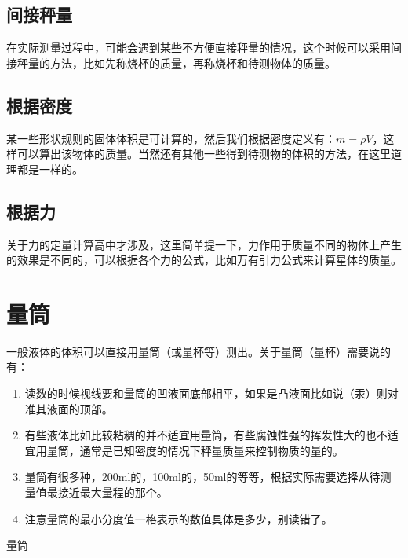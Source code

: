 \documentclass[12pt,twoside]{exam}
\begin{document}
\begin{knowledge}
\subsection{间接秤量}
在实际测量过程中，可能会遇到某些不方便直接秤量的情况，这个时候可以采用间接秤量的方法，比如先称烧杯的质量，再称烧杯和待测物体的质量。

\subsection{根据密度}
某一些形状规则的固体体积是可计算的，然后我们根据密度定义有：$m=\rho V$，这样可以算出该物体的质量。当然还有其他一些得到待测物的体积的方法，在这里道理都是一样的。

\subsection{根据力}
关于力的定量计算高中才涉及，这里简单提一下，力作用于质量不同的物体上产生的效果是不同的，可以根据各个力的公式，比如万有引力公式来计算星体的质量。



\pagebreak
\section{量筒}
\vspace*{20pt}
\noindent
\begin{minipage}{\textwidth}
\begin{minipage}[c][6cm][c]{0.8\textwidth}
一般液体的体积可以直接用量筒（或量杯等）测出。关于量筒（量杯）需要说的有：
\begin{enumerate}
\item  读数的时候视线要和量筒的凹液面底部相平，如果是凸液面比如说（汞）则对准其液面的顶部。
\item 有些液体比如比较粘稠的并不适宜用量筒，有些腐蚀性强的挥发性大的也不适宜用量筒，通常是已知密度的情况下秤量质量来控制物质的量的。
\item 量筒有很多种，200ml的，100ml的，50ml的等等，根据实际需要选择从待测量值最接近最大量程的那个。
\item 注意量筒的最小分度值一格表示的数值具体是多少，别读错了。
\end{enumerate}
 
\end{minipage}\hfill
\begin{minipage}[c][6cm][c]{0.2\textwidth}
\begin{linefig}[0.8]{量筒}
\end{linefig}
\end{minipage} 
\end{minipage} 


\end{knowledge}
\end{document}
